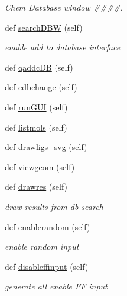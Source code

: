 \begin{DoxyCompactItemize}
\begin{DoxyCompactList}\small\item\em Chem Database window \#\#\#\#. \end{DoxyCompactList}\item 
def \hyperlink{classmolSimplify_1_1Classes_1_1mGUI_1_1mGUI_a3e26f5921315eb26fb15784d35777abc}{search\+D\+BW} (self)
\begin{DoxyCompactList}\small\item\em enable add to database interface \end{DoxyCompactList}\item 
def \hyperlink{classmolSimplify_1_1Classes_1_1mGUI_1_1mGUI_a884a7c464905d6826748d810df6e662c}{qaddc\+DB} (self)
\item 
def \hyperlink{classmolSimplify_1_1Classes_1_1mGUI_1_1mGUI_ac9ebe17dccf2920dce6b4514930591b3}{cdbchange} (self)
\item 
def \hyperlink{classmolSimplify_1_1Classes_1_1mGUI_1_1mGUI_accc09706b7fa5163bde577f20f37b949}{run\+G\+UI} (self)
\item 
def \hyperlink{classmolSimplify_1_1Classes_1_1mGUI_1_1mGUI_a16d69689d781abb8748ef8305c1f3f09}{listmols} (self)
\item 
def \hyperlink{classmolSimplify_1_1Classes_1_1mGUI_1_1mGUI_ac1aa02ac1f1b4cf8c25d56eff59b80a8}{drawligs\+\_\+svg} (self)
\item 
def \hyperlink{classmolSimplify_1_1Classes_1_1mGUI_1_1mGUI_a9bfdf313e1f54f9a2bc379b63cee12fc}{viewgeom} (self)
\item 
def \hyperlink{classmolSimplify_1_1Classes_1_1mGUI_1_1mGUI_afccc512ef51279ba9c7b7e64d595f5f8}{drawres} (self)
\begin{DoxyCompactList}\small\item\em draw results from db search \end{DoxyCompactList}\item 
def \hyperlink{classmolSimplify_1_1Classes_1_1mGUI_1_1mGUI_adfd50a6b9fc2cd7d0e17ea17cb372d36}{enablerandom} (self)
\begin{DoxyCompactList}\small\item\em enable random input \end{DoxyCompactList}\item 
def \hyperlink{classmolSimplify_1_1Classes_1_1mGUI_1_1mGUI_ad6ae299b232bb0d39d36ee43fd676c5c}{disableffinput} (self)
\begin{DoxyCompactList}\small\item\em generate all enable FF input \end{DoxyCompactList}\item 

\end{DoxyCompactItemize}

